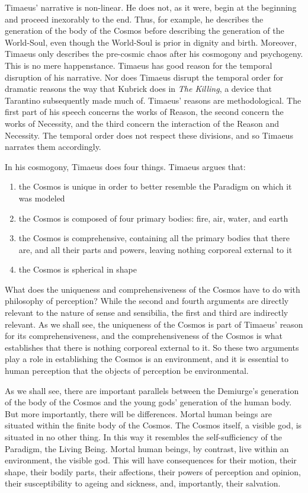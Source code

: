 Timaeus' narrative is non-linear. He does not, as it were, begin at the beginning and proceed inexorably to the end. Thus, for example, he describes the generation of the body of the Cosmos before describing the generation of the World-Soul, even though the World-Soul is prior in dignity and birth. Moreover, Timaeus only describes the pre-cosmic chaos after his cosmogony and psychogeny. This is no mere happenstance. Timaeus has good reason for the temporal disruption of his narrative. Nor does Timaeus disrupt the temporal order for dramatic reasons the way that Kubrick does in \emph{The Killing}, a device that Tarantino subsequently made much of. Timaeus' reasons are methodological. The first part of his speech concerns the works of Reason, the second concern the works of Necessity, and the third concern the interaction of the Reason and Necessity. The temporal order does not respect these divisions, and so Timaeus narrates them accordingly.

In his cosmogony, Timaeus does four things. Timaeus argues that:
\begin{enumerate}[(1)]
	\item the Cosmos is unique in order to better resemble the Paradigm on which it was modeled
	\item the Cosmos is composed of four primary bodies: fire, air, water, and earth
	\item the Cosmos is comprehensive, containing all the primary bodies that there are, and all their parts and powers, leaving nothing corporeal external to it
	\item the Cosmos is spherical in shape
\end{enumerate}
What does the uniqueness and comprehensiveness of the Cosmos have to do with philosophy of perception? While the second and fourth arguments are directly relevant to the nature of sense and sensibilia, the first and third are indirectly relevant. As we shall see, the uniqueness of the Cosmos is part of Timaeus' reason for its comprehensiveness, and the comprehensiveness of the Cosmos is what establishes that there is nothing corporeal external to it. So these two arguments play a role in establishing the Cosmos is an environment, and it is essential to human perception that the objects of perception be environmental.

As we shall see, there are important parallels between the Demiurge's generation of the body of the Cosmos and the young gods' generation of the human body. But more importantly, there will be differences. Mortal human beings are situated within the finite body of the Cosmos. The Cosmos itself, a visible god, is situated in no other thing. In this way it resembles the self-sufficiency of the Paradigm, the Living Being. Mortal human beings, by contrast, live within an environment, the visible god. This will have consequences for their motion, their shape, their bodily parts, their affections, their powers of perception and opinion, their susceptibility to ageing and sickness, and, importantly, their salvation.

